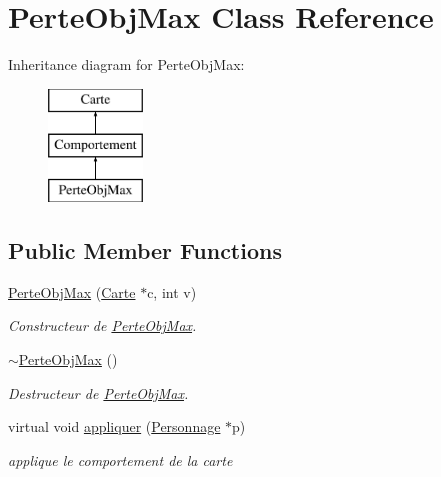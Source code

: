 \hypertarget{class_perte_obj_max}{\section{Perte\-Obj\-Max Class Reference}
\label{class_perte_obj_max}
}
Inheritance diagram for Perte\-Obj\-Max\-:\begin{figure}[H]
\begin{center}
\leavevmode
\includegraphics[height=3.000000cm]{class_perte_obj_max}
\end{center}
\end{figure}
\subsection*{Public Member Functions}
\begin{DoxyCompactItemize}
\item 
\hyperlink{class_perte_obj_max_a09e5098794871ff918ada7a0be551a8a}{Perte\-Obj\-Max} (\hyperlink{class_carte}{Carte} $\ast$c, int v)
\begin{DoxyCompactList}\small\item\em Constructeur de \hyperlink{class_perte_obj_max}{Perte\-Obj\-Max}. \end{DoxyCompactList}\item 
\hypertarget{class_perte_obj_max_a4968847588d00d3a4e4d158a960c531c}{\hyperlink{class_perte_obj_max_a4968847588d00d3a4e4d158a960c531c}{$\sim$\-Perte\-Obj\-Max} ()}\label{class_perte_obj_max_a4968847588d00d3a4e4d158a960c531c}

\begin{DoxyCompactList}\small\item\em Destructeur de \hyperlink{class_perte_obj_max}{Perte\-Obj\-Max}. \end{DoxyCompactList}\item 
virtual void \hyperlink{class_perte_obj_max_a929e1c6370247feb937ae1835648a441}{appliquer} (\hyperlink{class_personnage}{Personnage} $\ast$p)
\begin{DoxyCompactList}\small\item\em applique le comportement de la carte \end{DoxyCompactList}\end{DoxyCompactItemize}
